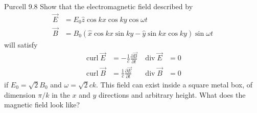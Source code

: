 \documentclass[makesolutionspdf]{esg8022pset}
\DeclareMathOperator{\curl}{curl}
\begin{document}
\begin{problem}{Purcell 9.8}
  Show that the electromagnetic field described by
  \begin{align*}
    \vec E & = E_0 \hat z \cos kx \cos ky \cos \omega t \\
    \vec B & = B_0(\hat x \cos kx \sin ky - \hat y \sin kx \cos ky) \sin \omega t
  \end{align*}
  will satisfy
  \begin{align*}
    \curl \vec E & = -\frac{1}{c}\frac{\partial \vec B}{\partial t} &
      \operatorname{div}\vec E & = 0 \\
    \curl \vec B & = \frac{1}{c}\frac{\partial \vec E}{\partial t} &
      \operatorname{div}\vec B & = 0
  \end{align*}
  if $E_0 = \sqrt{2}B_0$ and $\omega = \sqrt{2}ck$. This field can exist
  inside a square metal box, of dimension $\pi / k$ in the $x$ and $y$ directions
  and arbitrary height. What does the magnetic field look like?
\end{problem}
\end{document}
